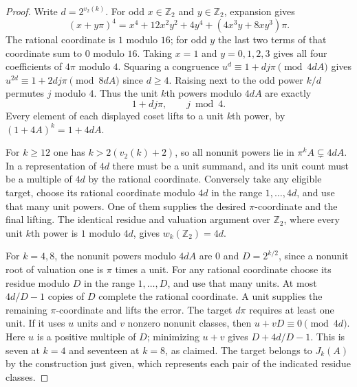 \documentclass[11pt,letterpaper]{article}
\theoremstyle{definition}
\numberwithin{equation}{section}
\begin{document}
\begin{proof}
Write $d=2^{v_2(k)}$. For odd $x\in\mathbb Z_2$ and
$y\in\mathbb Z_2$, expansion gives
\[
 (x+y\pi)^4=x^4+12x^2y^2+4y^4+
                          (4x^3y+8xy^3)\pi .
\]
The rational coordinate is $1$ modulo $16$; for odd $y$ the last
two terms of that coordinate sum to $0$ modulo $16$. Taking $x=1$
and $y=0,1,2,3$ gives all four coefficients of $4\pi$ modulo $4$.
Squaring a congruence $u^d\equiv1+dj\pi\pmod{4dA}$ gives
$u^{2d}\equiv1+2dj\pi\pmod{8dA}$ since $d\ge4$. Raising next
to the odd power $k/d$ permutes $j$ modulo $4$. Thus the unit
$k$th powers modulo $4dA$ are exactly
\[
                       1+dj\pi,\qquad j\bmod4 .
\]
Every element of each displayed coset lifts to a unit $k$th power,
by $(1+4A)^k=1+4dA$.

For $k\ge12$ one has $k>2(v_2(k)+2)$, so all nonunit powers lie in
$\pi^kA\subsetneq4dA$. In a representation of $4d$ there must be
a unit summand, and its unit count must be a multiple of $4d$ by
the rational coordinate. Conversely take any eligible target, choose
its rational coordinate modulo $4d$ in the range $1,\ldots,4d$,
and use that many unit powers. One of them supplies the desired
$\pi$-coordinate and the final lifting. The identical residue and
valuation argument over $\mathbb Z_2$, where every unit $k$th
power is $1$ modulo $4d$, gives $w_k(\mathbb Z_2)=4d$.

For $k=4,8$, the nonunit powers modulo $4dA$ are $0$ and
$D=2^{k/2}$, since a nonunit root of valuation one is $\pi$ times
a unit. For any rational coordinate choose its residue modulo $D$
in the range $1,\ldots,D$, and use that many units. At most
$4d/D-1$ copies of $D$ complete the rational coordinate. A unit
supplies the remaining $\pi$-coordinate and lifts the error.
The target $d\pi$ requires at least one unit. If it uses $u$ units
and $v$ nonzero nonunit classes, then $u+vD\equiv0\pmod{4d}$.
Here $u$ is a positive multiple of $D$; minimizing $u+v$ gives
$D+4d/D-1$. This is seven at $k=4$ and seventeen at $k=8$, as
claimed. The target belongs to $J_k(A)$ by the construction just
given, which represents each pair of the indicated residue classes.
\end{proof}
\end{document}
